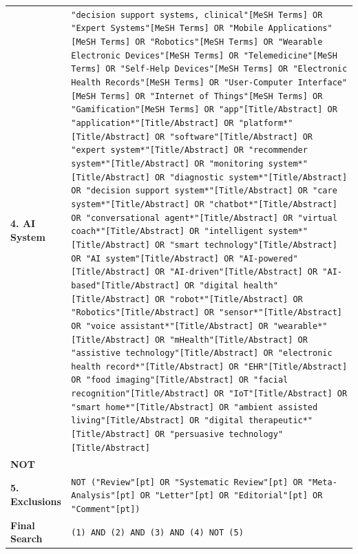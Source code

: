 \begin{longtable}{p{}p{}}
    \textbf{4. AI System}        &
    \footnotesize\texttt{"decision support systems, clinical"[MeSH Terms] OR
    "Expert Systems"[MeSH Terms] OR
    "Mobile Applications"[MeSH Terms] OR
    "Robotics"[MeSH Terms] OR
    "Wearable Electronic Devices"[MeSH Terms] OR
    "Telemedicine"[MeSH Terms] OR
    "Self-Help Devices"[MeSH Terms] OR
    "Electronic Health Records"[MeSH Terms] OR
    "User-Computer Interface"[MeSH Terms] OR
    "Internet of Things"[MeSH Terms] OR
    "Gamification"[MeSH Terms] OR
    "app"[Title/Abstract] OR
    "application*"[Title/Abstract] OR
    "platform*"[Title/Abstract] OR
    "software"[Title/Abstract] OR
    "expert system*"[Title/Abstract] OR
    "recommender system*"[Title/Abstract] OR
    "monitoring system*"[Title/Abstract] OR
    "diagnostic system*"[Title/Abstract] OR
    "decision support system*"[Title/Abstract] OR
    "care system*"[Title/Abstract] OR
    "chatbot*"[Title/Abstract] OR
    "conversational agent*"[Title/Abstract] OR
    "virtual coach*"[Title/Abstract] OR
    "intelligent system*"[Title/Abstract] OR
    "smart technology"[Title/Abstract] OR
    "AI system"[Title/Abstract] OR
    "AI-powered"[Title/Abstract] OR
    "AI-driven"[Title/Abstract] OR
    "AI-based"[Title/Abstract] OR
    "digital health"[Title/Abstract] OR
    "robot*"[Title/Abstract] OR
    "Robotics"[Title/Abstract] OR
    "sensor*"[Title/Abstract] OR
    "voice assistant*"[Title/Abstract] OR
    "wearable*"[Title/Abstract] OR
    "mHealth"[Title/Abstract] OR
    "assistive technology"[Title/Abstract] OR
    "electronic health record*"[Title/Abstract] OR
    "EHR"[Title/Abstract] OR
    "food imaging"[Title/Abstract] OR
    "facial recognition"[Title/Abstract] OR
    "IoT"[Title/Abstract] OR
    "smart home*"[Title/Abstract] OR
    "ambient assisted living"[Title/Abstract] OR
    "digital therapeutic*"[Title/Abstract] OR
    "persuasive technology"[Title/Abstract]}                                            \\
    \addlinespace

    \textbf{NOT}                 &
    \\
    \addlinespace

    \textbf{5. Exclusions}       &
    \footnotesize\texttt{NOT ("Review"[pt] OR
    "Systematic Review"[pt] OR
    "Meta-Analysis"[pt] OR
    "Letter"[pt] OR
    "Editorial"[pt] OR
    "Comment"[pt])}                                                                     \\
    \addlinespace

    \textbf{Final Search}        & \texttt{(1) AND (2) AND (3) AND (4) NOT (5)}         \\
\end{longtable}
